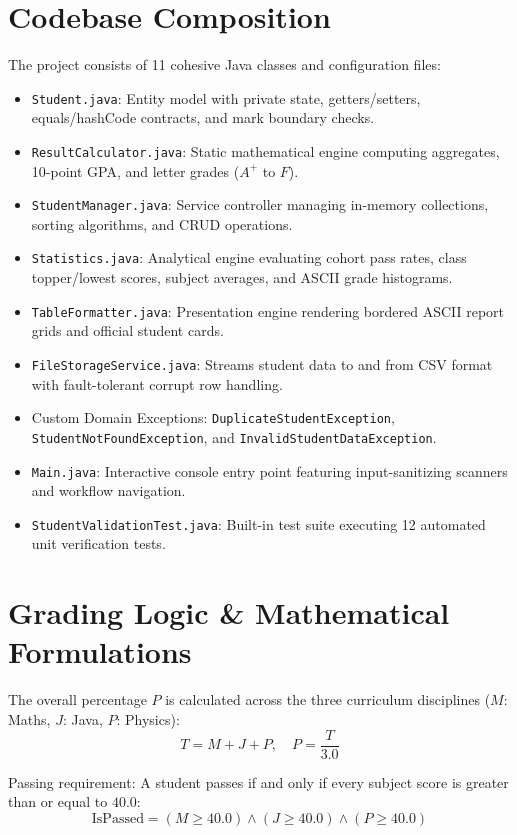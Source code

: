\documentclass[12pt,a4paper]{report}
\begin{document}
\section{Codebase Composition}
The project consists of 11 cohesive Java classes and configuration files:
\begin{itemize}
    \item \texttt{Student.java}: Entity model with private state, getters/setters, equals/hashCode contracts, and mark boundary checks.
    \item \texttt{ResultCalculator.java}: Static mathematical engine computing aggregates, 10-point GPA, and letter grades ($A^+$ to $F$).
    \item \texttt{StudentManager.java}: Service controller managing in-memory collections, sorting algorithms, and CRUD operations.
    \item \texttt{Statistics.java}: Analytical engine evaluating cohort pass rates, class topper/lowest scores, subject averages, and ASCII grade histograms.
    \item \texttt{TableFormatter.java}: Presentation engine rendering bordered ASCII report grids and official student cards.
    \item \texttt{FileStorageService.java}: Streams student data to and from CSV format with fault-tolerant corrupt row handling.
    \item Custom Domain Exceptions: \texttt{DuplicateStudentException}, \texttt{StudentNotFoundException}, and \texttt{InvalidStudentDataException}.
    \item \texttt{Main.java}: Interactive console entry point featuring input-sanitizing scanners and workflow navigation.
    \item \texttt{StudentValidationTest.java}: Built-in test suite executing 12 automated unit verification tests.
\end{itemize}

\section{Grading Logic \& Mathematical Formulations}
The overall percentage $P$ is calculated across the three curriculum disciplines ($M$: Maths, $J$: Java, $P$: Physics):
\begin{equation}
    T = M + J + P, \quad P = \frac{T}{3.0}
\end{equation}

Passing requirement: A student passes if and only if every subject score is greater than or equal to $40.0$:
\begin{equation}
    \text{IsPassed} = (M \ge 40.0) \land (J \ge 40.0) \land (P \ge 40.0)
\end{equation}
\end{document}
